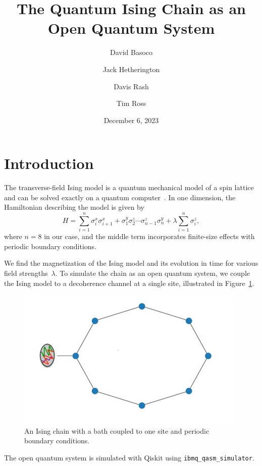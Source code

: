 \documentclass[12pt, twocolumn]{article}
\title{The Quantum Ising Chain as an Open Quantum System}
\author{David Basoco \and Jack Hetherington \and Davis Rash \and Tim Ross}
\date{December 6, 2023}
\begin{document}

  \maketitle

  \section{Introduction}
  The transverse-field Ising model is a quantum mechanical model of a spin lattice and can be solved exactly on a quantum computer~\cite{CerveraLierta18}. In one dimension, the Hamiltonian describing the model is given by
  \begin{equation}
    \label{eq:system-hamiltonian}
    H = \sum_{i = 1}^{n} \sigma_{i}^{x} \sigma_{i + 1}^{x}
        + \sigma_{1}^{y} \sigma_{2}^{z} \dotsm \sigma_{n - 1}^{z} \sigma_{n}^{y}
        + \lambda \sum_{i = 1}^{n} \sigma_{i}^{z},
  \end{equation}
  where \( n = 8 \) in our case, and the middle term incorporates finite-size effects with periodic boundary conditions.

  We find the magnetization of the Ising model and its evolution in time for various field strengths~\( \lambda \). To simulate the chain as an open quantum system, we couple the Ising model to a decoherence channel at a single site, illustrated in Figure~\ref{fig:ising-chain-with-environment}.
  \begin{figure}
    \centering
    \includegraphics[width=\linewidth]{images/ising_chain_with_environment.png}
    \caption{An Ising chain with a bath coupled to one site and periodic boundary conditions.%
      \label{fig:ising-chain-with-environment}}
  \end{figure}
  The open quantum system is simulated with Qiskit using \texttt{ibmq\_qasm\_simulator}.
\end{document}
